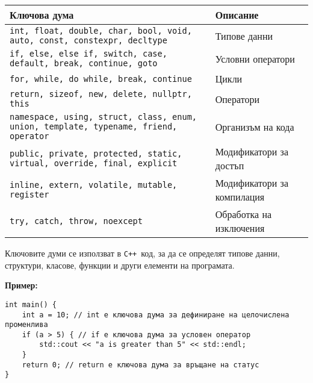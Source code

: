\documentclass[oneside]{book}
\newcommand*{\code}[1]{\texttt{#1}}
\newcommand*{\cpp}{\texttt{C++}\ }
\begin{document}
\begin{center}\begin{tabular}{|C|D|}
    \hline Ключова дума    &   Описание\\\hline\hline
    \vspace{3pt}\code{int, float, double, char, bool, void, auto, const, constexpr, decltype}\vspace{3pt} & Типове данни\\\hline
    \vspace{3pt}\code{if, else, else if, switch, case, default, break, continue, goto}\vspace{3pt} & Условни оператори\\\hline
    \vspace{3pt}\code{for, while, do while, break, continue}\vspace{3pt} & Цикли\\\hline
    \vspace{3pt}\code{return, sizeof, new, delete, nullptr, this}\vspace{3pt} & Оператори\\\hline
    \vspace{3pt}\code{namespace, using, struct, class, enum, union, template, typename, friend, operator}\vspace{3pt} & Организъм на кода\\\hline
    \vspace{3pt}\code{public, private, protected, static, virtual, override, final, explicit}\vspace{3pt} & Модификатори за достъп\\\hline
    \vspace{3pt}\code{inline, extern, volatile, mutable, register}\vspace{3pt} & Модификатори за компилация\\\hline
    \vspace{3pt}\code{try, catch, throw, noexcept}\vspace{3pt} & Обработка на изключения\\\hline
\end{tabular}\end{center}

Ключовите думи се използват в \cpp код, за да се определят типове данни, структури, класове, функции и други елементи на програмата.

\textbf{Пример:}
\begin{mdframed}\begin{lstlisting}
int main() {
    int a = 10; // int е ключова дума за дефиниране на целочислена променлива
    if (a > 5) { // if е ключова дума за условен оператор
        std::cout << "a is greater than 5" << std::endl;
    }
    return 0; // return е ключова дума за връщане на статус
}    
\end{lstlisting}\end{mdframed}
\end{document}
